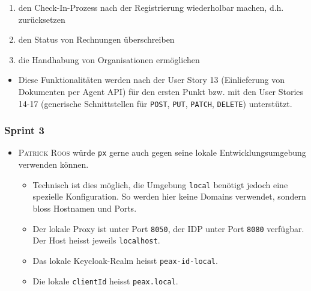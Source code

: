 \begin{itemize}
\begin{enumerate}
            \item den Check-In-Prozess nach der Registrierung wiederholbar machen, d.h. zurücksetzen
            \item den Status von Rechnungen überschreiben
            \item die Handhabung von Organisationen ermöglichen
        \end{enumerate}
        \begin{itemize}
            \item Diese Funktionalitäten werden nach der User Story 13 (Einlieferung von Dokumenten per Agent API) für den ersten Punkt bzw. mit den User Stories 14-17 (generische Schnittstellen für \texttt{POST}, \texttt{PUT}, \texttt{PATCH}, \texttt{DELETE}) unterstützt.
        \end{itemize}
\end{itemize}

\subsubsection{Sprint 3}

\begin{itemize}
    \item \textsc{Patrick Roos} würde \texttt{px} gerne auch gegen seine lokale Entwicklungsumgebung verwenden können.
        \begin{itemize}
            \item Technisch ist dies möglich, die Umgebung \texttt{local} benötigt jedoch eine spezielle Konfiguration. So werden hier keine Domains verwendet, sondern bloss Hostnamen und Ports.
            \item Der lokale Proxy ist unter Port \texttt{8050}, der IDP unter Port \texttt{8080} verfügbar. Der Host heisst jeweils \texttt{localhost}.
            \item Das lokale Keycloak-Realm heisst \texttt{peax-id-local}.
            \item Die lokale \texttt{clientId} heisst \texttt{peax.local}.
        \end{itemize}
\end{itemize}
